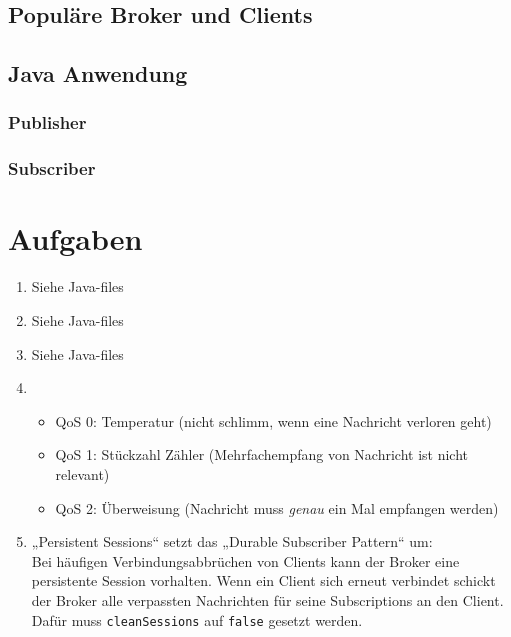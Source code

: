 \subsection{Populäre Broker und Clients}

\subsection{Java Anwendung}
\subsubsection{Publisher}
\subsubsection{Subscriber}

\section{Aufgaben}
\begin{enumerate}
\item Siehe Java-files
\item Siehe Java-files
\item Siehe Java-files
\item \begin{itemize}
\item QoS 0: Temperatur (nicht schlimm, wenn eine Nachricht verloren geht)
\item QoS 1: Stückzahl Zähler (Mehrfachempfang von Nachricht ist nicht relevant)
\item QoS 2: Überweisung (Nachricht muss \emph{genau} ein Mal empfangen werden)
\end{itemize}
\item „Persistent Sessions“ setzt das „Durable Subscriber Pattern“ um:\\
Bei häufigen Verbindungsabbrüchen von Clients kann der Broker eine persistente Session vorhalten. Wenn ein Client sich erneut verbindet schickt der Broker alle verpassten Nachrichten für seine Subscriptions an den Client.\\
Dafür muss \lstinline$cleanSessions$ auf \lstinline$false$ gesetzt werden.
\end{enumerate}












